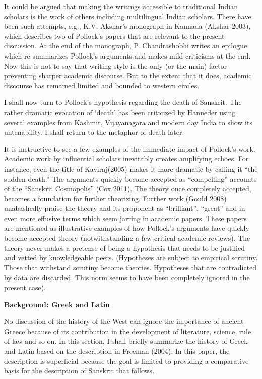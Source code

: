 It could be argued that making the writings accessible to traditional Indian scholars is the work of others including multilingual Indian scholars. There have been such attempts, e.g., K.V. Akshar’s monograph in Kannada (Akshar 2003), which describes two of Pollock’s papers that are relevant to the present discussion. At the end of the monograph, P. Chandrashobhi writes an epilogue which re-summarizes Pollock’s arguments and makes mild criticisms at the end. Now this is not to say that writing style is the only (or the main) factor preventing sharper academic discourse. But to the extent that it does, academic discourse has remained limited and bounded to western circles. 

I shall now turn to Pollock’s hypothesis regarding the death of Sanskrit. The rather dramatic evocation of ‘death’ has been criticized by Hanneder using several examples from Kashmir, Vijayanagara and modern day India to show its untenability. I shall return to the metaphor of death later.

It is instructive to see a few examples of the immediate impact of Pollock’s work. Academic work by influential scholars inevitably creates amplifying echoes. For instance, even the title of Kaviraj(2005) makes it more dramatic by calling it “the sudden death.” The arguments quickly become accepted as “compelling” accounts of the “Sanskrit Cosmopolis” (Cox 2011). The theory once completely accepted, becomes a foundation for further theorizing. Further work (Gould 2008) unabashedly praise the theory and its proponent as “brilliant”, “great” and in even more effusive terms which seem jarring in academic papers. These papers are mentioned as illustrative examples of how Pollock’s arguments have quickly become accepted theory (notwithstanding a few critical academic reviews). The theory never makes a pretense of being a hypothesis that needs to be justified and vetted by knowledgeable peers. (Hypotheses are subject to empirical scrutiny. Those that withstand scrutiny become theories. Hypotheses that are contradicted by data are discarded. This norm seems to have been completely ignored in the present case). 
\medskip

{\bf Background: Greek and Latin}
\smallskip

No discussion of the history of the West can ignore the importance of ancient Greece because of its contribution in the development of literature, science, rule of law and so on. In this section, I shall briefly summarize the history of Greek and Latin based on the description in Freeman (2004). In this paper, the description is superficial because the goal is limited to providing a comparative basis for the description of Sanskrit that follows. 

